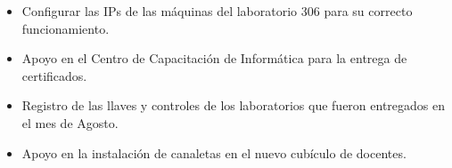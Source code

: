 \documentclass[12pt]{report}
\begin{document}
\begin{itemize}
    \item Configurar las IPs de las máquinas del laboratorio 306 para su correcto funcionamiento.
    
    \item Apoyo en el Centro de Capacitación de Informática para la entrega de certificados.
    
    \item Registro de las llaves y controles de los laboratorios que fueron entregados en el mes de Agosto.

    \item Apoyo en la instalación de canaletas en el nuevo cubículo de docentes.
\end{itemize}
\end{document}
